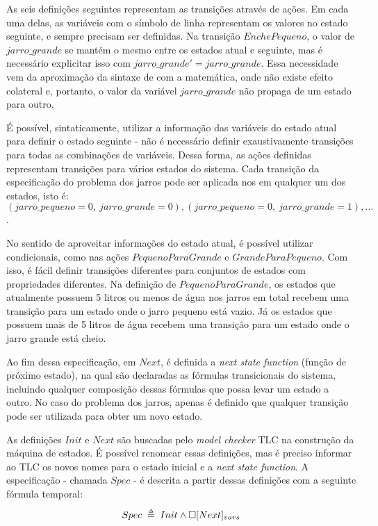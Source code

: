 As seis definições seguintes representam as transições através de ações. Em cada uma delas, as variáveis com o símbolo de linha representam os valores no estado seguinte, e sempre precisam ser definidas. Na transição $EnchePequeno$, o valor de $jarro\_grande$ se mantém o mesmo entre os estados atual e seguinte, mas é necessário explicitar isso com $jarro\_grande' = jarro\_grande$. Essa necessidade vem da aproximação da sintaxe de \TLA com a matemática, onde não existe efeito colateral e, portanto, o valor da variável $jarro\_grande$ não propaga de um estado para outro.

É possível, sintaticamente, utilizar a informação das variáveis do estado atual para definir o estado seguinte - não é necessário definir exaustivamente transições para todas as combinações de variáveis. Dessa forma, as ações definidas representam transições para vários estados do sistema. Cada transição da especificação do problema dos jarros pode ser aplicada nos em qualquer um dos estados, isto é: $(jarro\_pequeno = 0,\ jarro\_grande = 0), (jarro\_pequeno = 0,\ jarro\_grande = 1), \dots$.

No sentido de aproveitar informações do estado atual, é possível utilizar condicionais, como nas ações $PequenoParaGrande$ e $GrandeParaPequeno$. Com isso, é fácil definir transições diferentes para conjuntos de estados com propriedades diferentes. Na definição de $PequenoParaGrande$, os estados que atualmente possuem 5 litros ou menos de água nos jarros em total recebem uma transição para um estado onde o jarro pequeno está vazio. Já os estados que possuem mais de 5 litros de água recebem uma transição para um estado onde o jarro grande está cheio.

Ao fim dessa especificação, em $Next$, é definida a \textit{next state function} (função de próximo estado), na qual são declaradas as fórmulas transicionais do sistema, incluindo qualquer composição dessas fórmulas que possa levar um estado a outro. No caso do problema dos jarros, apenas é definido que qualquer transição pode ser utilizada para obter um novo estado.

As definições $Init$ e $Next$ são buscadas pelo \textit{model checker} TLC na construção da máquina de estados. É possível renomear essas definições, mas é preciso informar ao TLC os novos nomes para o estado inicial e a \textit{next state function}. A especificação - chamada $Spec$ - é descrita a partir dessas definições com a seguinte fórmula temporal:

\[Spec \;\mathrel{\smash {{\stackrel{\scriptscriptstyle\Delta}{=}}}}\; Init \land \square [Next]_{vars}\]

